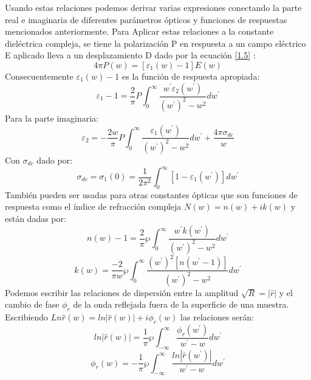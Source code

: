 \documentclass[a4paper,openright,12pt]{book}
\begin{document}
Usando estas relaciones podemos derivar varias expresiones conectando la parte real e imaginaria de diferentes parámetros ópticos y funciones de respuestas mencionados anteriormente. Para Aplicar estas relaciones a la constante dieléctrica compleja, se tiene la polarización P en respuesta a un campo eléctrico E aplicado lleva a un desplazamiento D dado por la ecuación  \ref{1.5} :
\begin{equation}
4\pi P(w)=[\varepsilon_{1}(w)-1]E(w)
\end{equation}
Consecuentemente $\varepsilon_{1}(w)-1$ es la función de respuesta apropiada:
\begin{equation}
\varepsilon_{1}-1=\frac{2}{\pi}P\int_{0}^{\infty}\frac{w^{'}\varepsilon_{2}(w^{'})}{(w^{'})^{2}-w^{2}}dw^{'}
\end{equation}
Para la parte imaginaria:
\begin{equation}
\varepsilon_{2}=-\frac{2w}{\pi}P\int_{0}^{\infty}\frac{\varepsilon_{1}(w^{'})}{(w^{'})^{2}-w^{2}}dw^{'}+\frac{4\pi\sigma
_{dc}}{w}
\end{equation}
Con $\sigma_{dc}$ dado por:
\begin{equation}
\sigma_{dc}=\sigma_{1}(0)=\frac{1}{2\pi^{2}}\int_{0}^{\infty}[1-\varepsilon_{1}(w^{'})]dw^{'}
\end{equation}
También pueden ser usadas para otras constantes ópticas que son funciones de respuesta como el índice de refracción compleja $N(w)=n(w)+ik(w)$ y están dadas por:
\begin{equation}
n(w)-1=\frac{2}{\pi}\wp\int_{0}^{\infty}\frac{w^{'}k(w^{'})}{(w^{'})^{2}-w^{2}}dw^{'}
\end{equation}
\begin{equation}
k(w)=\frac{-2}{\pi w}\wp\int_{0}^{\infty}\frac{(w^{'})^{2}[n(w^{'}-1)]}{(w^{'})^{2}-w^{2}}dw^{'}
\end{equation}
Podemos escribir las relaciones de dispersión entre la amplitud $\sqrt{R}=|\hat{r}|$ y el cambio de fase $\phi_{r} $ de la onda reflejada fuera de la superficie de una muestra. Escribiendo $Ln \hat{r}(w)=ln|\hat{r}(w)|+i\phi_{r}(w)$ las relaciones serán:
\begin{equation}
ln|\hat{r}(w)|=\frac{1}{\pi}\wp\int_{-\infty}^{\infty}\frac{\phi_{r}(w^{'})}{w^{'}-w}dw^{'}
\end{equation}
\begin{equation}
\phi_{r}(w)=-\frac{1}{\pi}\wp\int_{-\infty}^{\infty}\frac{ln|\hat{r}(w^{'})|}{w^{'}-w}dw^{'}
\end{equation}
\end{document}
